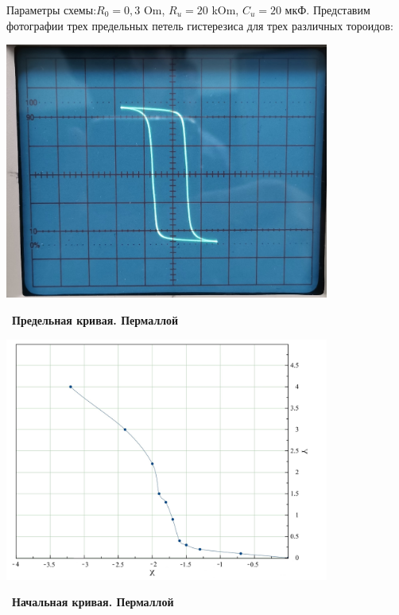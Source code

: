 \documentclass[a4paper,12pt]{article}
\begin{document}
\newpage

Параметры схемы:$R_0=0,3$ Om, $R_u=20$ kOm, $C_u=20$ мкФ.
Представим фотографии трех предельных петель гистерезиса для трех различных тороидов:

\newpage
\newpage

\begin{center}
	\includegraphics[width = 0.8\textwidth]{1.jpg}
\end{center}\
\textbf{Предельная кривая. Пермаллой}


\begin{center}
	\includegraphics[width = 0.8\textwidth]{1_rev.jpg}
\end{center}\
\textbf{Начальная кривая. Пермаллой}

\newpage
\end{document}

